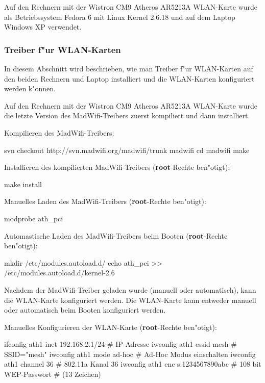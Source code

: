 Auf den Rechnern mit der Wistron CM9 Atheros AR5213A WLAN-Karte wurde
als Betriebssystem Fedora 6 mit Linux Kernel 2.6.18
und auf dem Laptop Windows XP verwendet.

\subsubsection{Treiber f"ur WLAN-Karten}

In diesem Abschnitt wird beschrieben, wie man Treiber f"ur WLAN-Karten
auf den beiden Rechnern und Laptop installiert und die WLAN-Karten
konfiguriert werden k"onnen.

Auf den Rechnern mit der Wistron CM9 Atheros AR5213A WLAN-Karte
wurde die letzte Version des MadWifi-Treibers zuerst kompiliert und dann
installiert.

Kompilieren des MadWifi-Treibers:
\begin{shelllst}
svn checkout http://svn.madwifi.org/madwifi/trunk madwifi
cd madwifi
make
\end{shelllst}

Installieren des kompilierten MadWifi-Treibers (\textbf{root}-Rechte ben"otigt):
\begin{shelllst}
make install
\end{shelllst}

Manuelles Laden des MadWifi-Treibers (\textbf{root}-Rechte ben"otigt):
\begin{shelllst}
modprobe ath_pci
\end{shelllst}

Automastische Laden des MadWifi-Treibers beim Booten
(\textbf{root}-Rechte ben"otigt):
\begin{shelllst}
mkdir /etc/modules.autoload.d/
echo ath_pci >> /etc/modules.autoload.d/kernel-2.6
\end{shelllst}

Nachdem der MadWifi-Treiber geladen wurde (manuell oder automatisch),
kann die WLAN-Karte konfiguriert werden. Die WLAN-Karte kann entweder
manuell oder automatisch beim Booten konfiguriert werden.

Manuelles Konfigurieren der WLAN-Karte (\textbf{root}-Rechte ben"otigt):
\begin{shelllst}
ifconfig ath1 inet 192.168.2.1/24 # IP-Adresse
iwconfig ath1 essid mesh          # SSID="mesh"
iwconfig ath1 mode ad-hoc         # Ad-Hoc Modus einschalten
iwconfig ath1 channel 36          # 802.11a Kanal 36
iwconfig ath1 enc s:1234567890abc # 108 bit WEP-Passwort
                                  # (13 Zeichen)
\end{shelllst}

